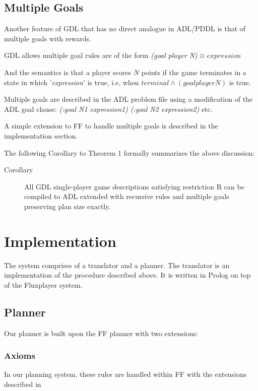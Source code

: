 \documentclass{article}
\begin{document}
\subsection{Multiple Goals}

Another feature of GDL that has no direct analogue in ADL/PDDL is
that of multiple goals with rewards. 

GDL allows multiple goal rules are of the form \newline
\emph{(goal player N)}$\equiv expression$

And the semantics is that a player scores $N$ points if the game
terminates in a state in which '\emph{expression}' is true, i.e, when
$terminal \land (goal player N)$ is true.

Multiple goals are described in the ADL problem file using a modification of the ADL goal clause:\newline\newline
\emph{(:goal N1 expression1)}\newline
\emph{(:goal N2 expression2)}\newline
etc.

A simple extension to FF to handle multiple goals is described in the implementation section.

The following Corollary to Theorem 1 formally summarizes the above discussion:

\begin{description}
\item [{Corollary}] All GDL single-player game descriptions satisfying restriction R can be compiled to ADL extended with recursive rules and multiple goals preserving plan size exactly.
\end{description}


\section{Implementation}

The system comprises of a translator and a planner. The translator
is an implementation of the procedure described above. It is written
in Prolog on top of the Fluxplayer system\cite{fluxplayer:aaai07}.

\subsection{Planner}
Our planner is built upon the FF planner\cite{hoffmann:ff} with two extensions:

\subsubsection{Axioms}
In our planning system, these rules are handled within FF with the extensions described in \cite{Thiebaux03indefense:jair}
\end{document}
